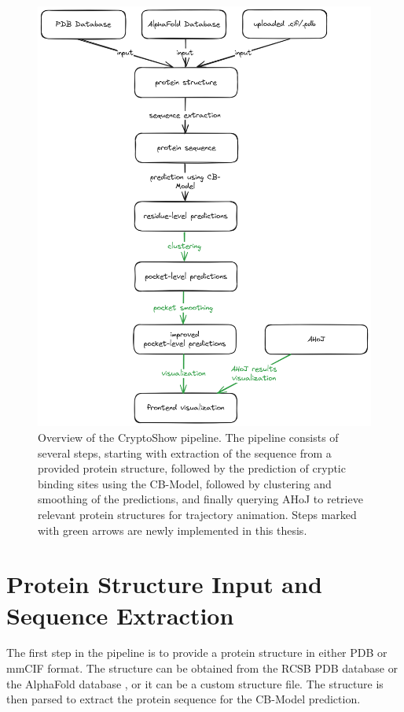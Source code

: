 \begin{figure}[htbp]
    \centering
    \includegraphics[width=\textwidth]{img/methodology-overview.png}
    \caption{Overview of the CryptoShow pipeline. The pipeline consists of several steps, starting with extraction of the sequence from a provided protein structure, followed by the prediction of cryptic binding sites using the CB-Model, followed by clustering and smoothing of the predictions, and finally querying AHoJ to retrieve relevant protein structures for trajectory animation. Steps marked with green arrows are newly implemented in this thesis.}
    \label{fig:pipeline-overview}
\end{figure}

\section{Protein Structure Input and Sequence Extraction}
\label{sec:structure-input}

The first step in the pipeline is to provide a protein structure in either PDB or mmCIF format. The structure can be obtained from the RCSB PDB database \cite{berman2000protein} or the AlphaFold database \cite{jumper2021highly}, or it can be a custom structure file. The structure is then parsed to extract the protein sequence for the CB-Model prediction.

